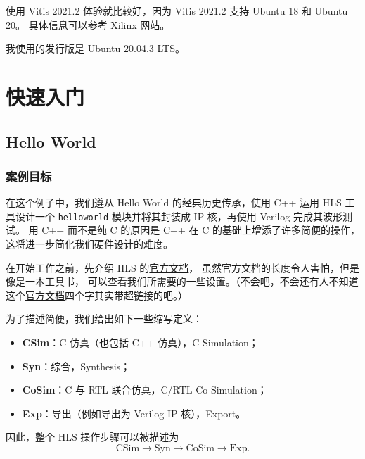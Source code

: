 \documentclass[Chinese,TC,use boldface,simple name]{beaulivre}
\newenvironment{tip}[1][提示]{%
    \begin{tcolorbox}[breakable,
        enhanced,
        width = \textwidth,
        colback = paper, colbacktitle = paper,
        colframe = gray!50, boxrule=0.2mm,
        coltitle = black,
        fonttitle = \sffamily,
        attach boxed title to top left = {yshift=-\tcboxedtitleheight/2, xshift=.5cm},
        boxed title style = {boxrule=0pt, colframe=paper},
        before skip = 0.3cm,
        after skip = 0.3cm,
        top = 3mm,
        bottom = 3mm,
        title={\scshape\sffamily #1}]%
}{\end{tcolorbox}}
\begin{document}
      使用 Vitis 2021.2 体验就比较好，因为 Vitis 2021.2 支持 Ubuntu 18 和 Ubuntu 20。
      具体信息可以参考 Xilinx 网站。

      \begin{tip}
        我使用的发行版是 Ubuntu 20.04.3 LTS。
      \end{tip}

\part{快速入门}

\chapter{Hello World}

  \section{案例目标}

    在这个例子中，我们遵从 Hello World 的经典历史传承，使用 C++ 运用 HLS 工具设计一个 \texttt{helloworld} 模块并将其封装成 IP 核，再使用 Verilog 完成其波形测试。
    用 C++ 而不是纯 C 的原因是 C++ 在 C 的基础上增添了许多简便的操作，
    这将进一步简化我们硬件设计的难度。

    在开始工作之前，先介绍 HLS 的\href{https://docs.xilinx.com/v/u/2017.4-English/ug902-vivado-high-level-synthesis}{官方文档}，
    虽然官方文档的长度令人害怕，但是像是一本工具书，
    可以查看我们所需要的一些设置。（不会吧，不会还有人不知道这个\href{https://docs.xilinx.com/v/u/2017.4-English/ug902-vivado-high-level-synthesis}{官方文档}四个字其实带超链接的吧。）

    \begin{definition}
      为了描述简便，我们给出如下一些缩写定义：
      \begin{itemize}
        \item {}\textbf{CSim}：C 仿真（也包括 C++ 仿真），C Simulation；
        \item {}\textbf{Syn}：综合，Synthesis；
        \item {}\textbf{CoSim}：C 与 RTL 联合仿真，C/RTL Co-Simulation；
        \item {}\textbf{Exp}：导出（例如导出为 Verilog IP 核），Export。
      \end{itemize}
      因此，整个 HLS 操作步骤可以被描述为
      \[
        \text{CSim}\longrightarrow\text{Syn}\longrightarrow\text{CoSim}\longrightarrow\text{Exp}.
      \]
    \end{definition}
\end{document}
